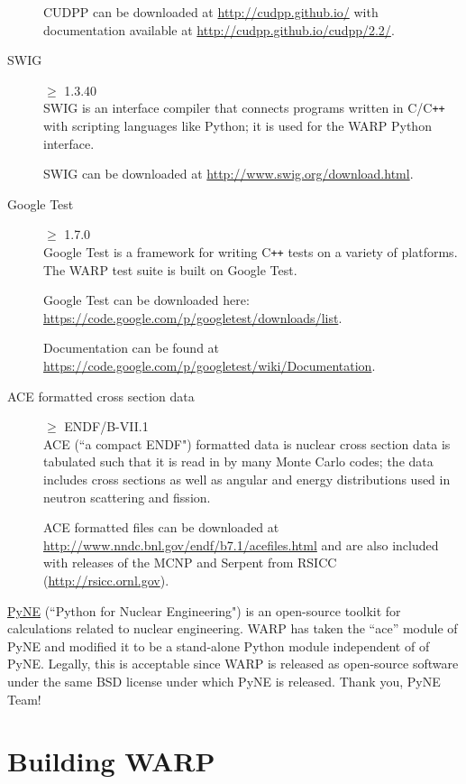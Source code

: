 \documentclass[twoside,a4paper]{refart}
\begin{document}
\begin{description}
CUDPP can be downloaded at \url{http://cudpp.github.io/} with documentation available at 
\url{http://cudpp.github.io/cudpp/2.2/}.

\item[SWIG]$\ge$ 1.3.40 \\
SWIG is an interface compiler that connects programs written in C/C\texttt{++} with scripting languages
like Python; it is used for the WARP Python interface.

SWIG can be downloaded at \url{http://www.swig.org/download.html}.

\item[Google Test]$\ge$ 1.7.0 \\
Google Test is a framework for writing C\texttt{++} tests on a variety of platforms. The WARP test suite
is built on Google Test.

Google Test can be downloaded here: \url{https://code.google.com/p/googletest/downloads/list}.

Documentation can be found at \url{https://code.google.com/p/googletest/wiki/Documentation}.

\item[ACE formatted cross section data]
$\ge$ ENDF/B-VII.1 \\
ACE (``a compact ENDF") formatted data is nuclear cross section data is tabulated such that it is read in 
by many Monte Carlo codes; the data includes cross sections as well as angular and energy distributions 
used in neutron scattering and fission.

ACE formatted files can be downloaded at \url{http://www.nndc.bnl.gov/endf/b7.1/acefiles.html} and are 
also included with releases of the MCNP and Serpent from RSICC (\url{http://rsicc.ornl.gov}).

\end{description}

\href{http://pyne.io/}{PyNE} (``Python for Nuclear Engineering") is an open-source toolkit for calculations related to nuclear engineering.  WARP has taken the ``ace'' module of PyNE and modified it to be a stand-alone Python module independent of of PyNE.  Legally, this is acceptable since WARP is released as open-source software under the same BSD license under which PyNE is released.  Thank you, PyNE Team!

\section{Building WARP}
\end{document}

